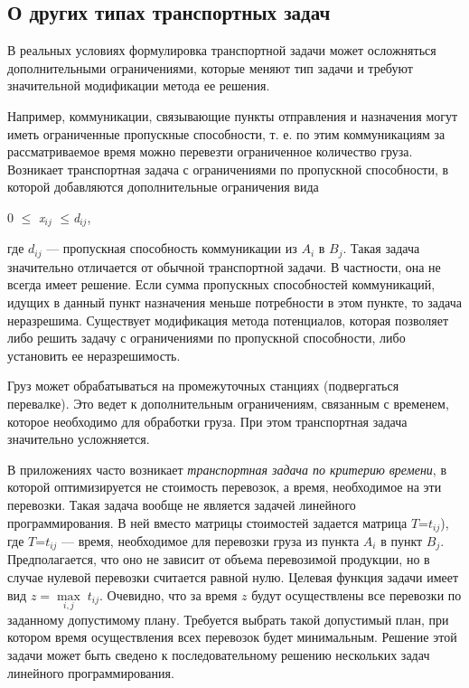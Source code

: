 {\subsection{О других типах транспортных задач}
В реальных условиях формулировка транспортной задачи может осложняться дополнительными ограничениями, которые меняют тип задачи и требуют значительной модификации метода ее решения.

Например, коммуникации, связывающие пункты отправления и назначения могут иметь ограниченные пропускные способности, т. е. по этим коммуникациям за рассматриваемое время можно перевезти ограниченное количество груза. Возникает транспортная задача с ограничениями по пропускной способности, в которой добавляются дополнительные ограничения вида
\begin{center}
0 $\mathrm{\le}$ \textit{x${}_{ij}$} $\mathrm{\le}$\textit{d${}_{ij}$},
\end{center}

где $d_{ij}$ — пропускная способность коммуникации из $A_{i}$ в $B_{j}$. Такая задача значительно отличается от обычной транспортной задачи. В частности, она не всегда имеет решение. Если сумма пропускных способностей коммуникаций, идущих в данный пункт назначения меньше потребности в этом пункте, то задача неразрешима. Существует модификация метода потенциалов, которая позволяет либо решить задачу с ограничениями по пропускной способности, либо установить ее неразрешимость.

Груз может обрабатываться на промежуточных станциях (подвергаться перевалке). Это ведет к дополнительным ограничениям, связанным с временем, которое необходимо для обработки груза. При этом транспортная задача значительно усложняется.

В приложениях часто возникает \textit{транспортная задача по критерию времени}, в которой оптимизируется не стоимость перевозок, а время, необходимое на эти перевозки. Такая задача вообще не является задачей линейного программирования. В ней вместо матрицы стоимостей задается матрица $T$=$t_{ij}$), где $T$=$t_{ij}$ — время, необходимое для перевозки груза из пункта $A_{i}$ в пункт $B_{j}$. Предполагается, что оно не зависит от объема перевозимой продукции, но в случае нулевой перевозки считается равной нулю. Целевая функция задачи имеет вид $z={\mathop{\max }\limits_{i,j}} \; t_{ij} $. Очевидно, что за время $z$ будут осуществлены все перевозки по заданному допустимому плану. Требуется выбрать такой допустимый план, при котором время осуществления всех перевозок будет минимальным. Решение этой задачи может быть сведено к последовательному решению нескольких задач линейного программирования.

}
